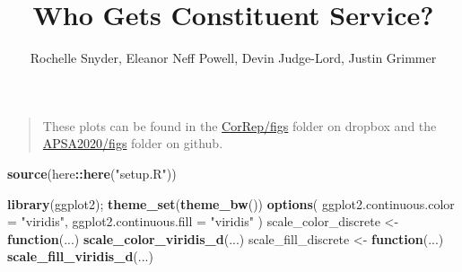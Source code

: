 \documentclass[
]{article}
\title{Who Gets Constituent Service?}
\author{Rochelle Snyder, Eleanor Neff Powell, Devin Judge-Lord, Justin
Grimmer}
\date{}
\newenvironment{Shaded}{\begin{snugshade}}{\end{snugshade}}
\newcommand{\ControlFlowTok}[1]{\textcolor[rgb]{0.13,0.29,0.53}{\textbf{#1}}}
\newcommand{\DataTypeTok}[1]{\textcolor[rgb]{0.13,0.29,0.53}{#1}}
\newcommand{\KeywordTok}[1]{\textcolor[rgb]{0.13,0.29,0.53}{\textbf{#1}}}
\newcommand{\NormalTok}[1]{#1}
\newcommand{\OperatorTok}[1]{\textcolor[rgb]{0.81,0.36,0.00}{\textbf{#1}}}
\newcommand{\StringTok}[1]{\textcolor[rgb]{0.31,0.60,0.02}{#1}}
\begin{document}
\maketitle

{
\setcounter{tocdepth}{2}
\tableofcontents
}
\begin{quote}
These plots can be found in the
\href{https://www.dropbox.com/home/CorRep/figs}{CorRep/figs} folder on
dropbox and the
\href{https://github.com/judgelord/correspondence/tree/master/APSA2020/Figs}{APSA2020/figs}
folder on github.
\end{quote}

\begin{Shaded}
\begin{Highlighting}[]
\KeywordTok{source}\NormalTok{(here}\OperatorTok{::}\KeywordTok{here}\NormalTok{(}\StringTok{"setup.R"}\NormalTok{))}

\KeywordTok{library}\NormalTok{(ggplot2); }\KeywordTok{theme\_set}\NormalTok{(}\KeywordTok{theme\_bw}\NormalTok{())}
  \KeywordTok{options}\NormalTok{(}
    \DataTypeTok{ggplot2.continuous.color =} \StringTok{"viridis"}\NormalTok{,}
    \DataTypeTok{ggplot2.continuous.fill =} \StringTok{"viridis"}
\NormalTok{  )}
\NormalTok{  scale\_color\_discrete \textless{}{-}}\StringTok{ }\ControlFlowTok{function}\NormalTok{(...)}
    \KeywordTok{scale\_color\_viridis\_d}\NormalTok{(...)}
\NormalTok{  scale\_fill\_discrete \textless{}{-}}\StringTok{ }\ControlFlowTok{function}\NormalTok{(...)}
    \KeywordTok{scale\_fill\_viridis\_d}\NormalTok{(...)}
\end{Highlighting}
\end{Shaded}
\end{document}
